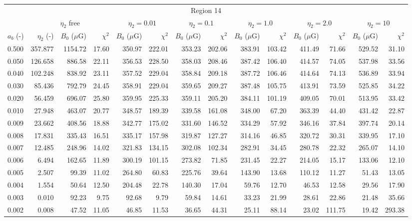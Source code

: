 \begin{tabular}{@{}lrrrrrrrrrrrrr@{}}
\toprule
\multicolumn{14}{c}{Region 14} \\
\cmidrule{1-14}
{} & \multicolumn{3}{c}{$\eta_2$ free} & \multicolumn{2}{c}{$\eta_2 = 0.01$}
   & \multicolumn{2}{c}{$\eta_2 = 0.1$} & \multicolumn{2}{c}{$\eta_2 = 1.0$}
   & \multicolumn{2}{c}{$\eta_2 = 2.0$} & \multicolumn{2}{c}{$\eta_2 = 10$} \\
\cmidrule(lr){2-4} \cmidrule(lr){5-6} \cmidrule(lr){7-8} \cmidrule(lr){9-10}
    \cmidrule(lr){11-12} \cmidrule(lr){13-14}
$a_b$ (-) & $\eta_2$ (-) & $B_0$ ($\mu$G) & $\chi^2$
& $B_0$ ($\mu$G) & $\chi^2$ & $B_0$ ($\mu$G) & $\chi^2$
& $B_0$ ($\mu$G) & $\chi^2$ & $B_0$ ($\mu$G) & $\chi^2$
& $B_0$ ($\mu$G) & $\chi^2$ \\
\cmidrule{1-14}
0.500 & 357.877 & 1154.72 & 17.60 & 350.97 & 222.01 & 353.23 & 202.06 & 383.91 & 103.42 & 411.49 & 71.66 & 529.52 & 31.10 \\
0.050 & 126.658 & 886.58 & 22.11 & 356.53 & 228.50 & 358.03 & 208.46 & 387.42 & 106.40 & 414.57 & 74.05 & 537.98 & 33.56 \\
0.040 & 102.248 & 838.92 & 23.11 & 357.52 & 229.04 & 358.84 & 209.18 & 387.72 & 106.46 & 414.64 & 74.13 & 536.89 & 33.94 \\
0.030 & 85.436 & 792.79 & 24.45 & 358.91 & 229.04 & 359.65 & 209.27 & 387.48 & 105.75 & 413.91 & 73.59 & 525.85 & 34.22 \\
0.020 & 56.459 & 696.07 & 25.80 & 359.95 & 225.33 & 359.11 & 205.20 & 384.11 & 101.19 & 409.05 & 70.01 & 513.95 & 33.42 \\
0.010 & 27.948 & 463.07 & 20.77 & 348.57 & 189.39 & 339.58 & 161.08 & 348.00 & 67.20 & 363.39 & 44.40 & 431.42 & 22.87 \\
0.009 & 23.662 & 408.56 & 18.88 & 342.77 & 175.02 & 331.60 & 146.52 & 334.29 & 57.92 & 346.16 & 37.84 & 397.74 & 20.14 \\
0.008 & 17.831 & 335.43 & 16.51 & 335.17 & 157.98 & 319.87 & 127.27 & 314.16 & 46.85 & 320.72 & 30.31 & 339.95 & 17.10 \\
0.007 & 12.485 & 248.96 & 14.02 & 321.83 & 134.15 & 302.08 & 102.34 & 282.91 & 34.45 & 280.78 & 22.32 & 265.07 & 14.10 \\
0.006 & 6.494 & 162.65 & 11.89 & 300.19 & 101.15 & 273.82 & 71.85 & 231.45 & 22.27 & 214.05 & 15.17 & 133.06 & 12.10 \\
0.005 & 2.507 & 99.39 & 11.02 & 264.80 & 60.83 & 225.76 & 39.64 & 143.90 & 13.68 & 110.12 & 11.27 & 51.43 & 13.05 \\
0.004 & 1.554 & 50.64 & 12.50 & 204.48 & 22.78 & 140.30 & 17.04 & 59.76 & 12.70 & 46.53 & 12.58 & 29.56 & 17.90 \\
0.003 & 0.010 & 92.23 & 9.75 & 92.68 & 9.79 & 59.84 & 14.61 & 33.23 & 21.99 & 28.61 & 22.86 & 21.48 & 35.66 \\
0.002 & 0.008 & 47.52 & 11.05 & 46.85 & 11.53 & 36.65 & 44.31 & 25.11 & 88.14 & 23.02 & 111.75 & 19.42 & 293.38 \\


\end{tabular}
